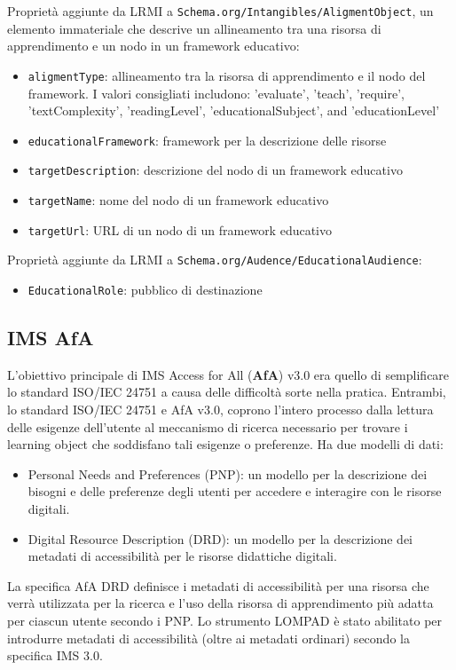 Proprietà aggiunte da LRMI a \texttt{Schema.org/Intangibles/AligmentObject}, un elemento immateriale che descrive un allineamento tra una risorsa di apprendimento e un nodo in un framework educativo:
\begin{itemize}
\item \texttt{aligmentType}: allineamento tra la risorsa di apprendimento e il nodo del framework. I valori consigliati includono: 'evaluate', 'teach', 'require', 'textComplexity', 'readingLevel', 'educationalSubject', and 'educationLevel'
\item \texttt{educationalFramework}: framework per la descrizione delle risorse
\item \texttt{targetDescription}: descrizione del nodo di un framework educativo
\item \texttt{targetName}: nome del nodo di un framework educativo
\item \texttt{targetUrl}: URL di un nodo di un framework educativo
\end{itemize}

Proprietà aggiunte da LRMI a \texttt{Schema.org/Audence/EducationalAudience}:
\begin{itemize}
\item \texttt{EducationalRole}: pubblico di destinazione
\end{itemize}

\subsection{IMS AfA}
L'obiettivo principale di IMS Access for All (\textbf{AfA}) v3.0 era quello di semplificare lo standard ISO/IEC 24751 a causa delle difficoltà sorte nella pratica. Entrambi, lo standard ISO/IEC 24751 e AfA v3.0, coprono l'intero processo dalla lettura delle esigenze dell'utente al meccanismo di ricerca necessario per trovare i learning object che soddisfano tali esigenze o preferenze. Ha due modelli di dati:
\begin{itemize}
\item Personal Needs and Preferences (PNP): un modello per la descrizione dei bisogni e delle preferenze degli utenti per accedere e interagire con le risorse digitali.
\item Digital Resource Description (DRD): un modello per la descrizione dei metadati di accessibilità per le risorse didattiche digitali.
\end{itemize}

La specifica AfA DRD definisce i metadati di accessibilità per una risorsa che verrà utilizzata per la ricerca e l'uso della risorsa di apprendimento più adatta per ciascun utente secondo i PNP. Lo strumento LOMPAD è stato abilitato per introdurre metadati di accessibilità (oltre ai metadati ordinari) secondo la specifica IMS 3.0.

